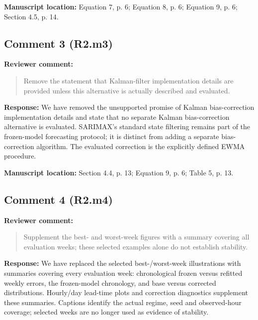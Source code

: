 \documentclass[11pt,a4paper]{article}
\begin{document}
\textbf{Manuscript location:} Equation 7, p. 6; Equation 8, p. 6; Equation 9, p. 6; Section 4.5, p. 14.
\begin{samepage}
\subsection*{Comment 3 (R2.m3)}
\textbf{Reviewer comment:}
\begin{quote}\small Remove the statement that Kalman-filter implementation details are provided unless this alternative is actually described and evaluated.\end{quote}
\end{samepage}
\textbf{Response:}
We have removed the unsupported promise of Kalman bias-correction implementation details and state that no separate Kalman bias-correction alternative is evaluated. SARIMAX's standard state filtering remains part of the frozen-model forecasting protocol; it is distinct from adding a separate bias-correction algorithm. The evaluated correction is the explicitly defined EWMA procedure.

\textbf{Manuscript location:} Section 4.4, p. 13; Equation 9, p. 6; Table 5, p. 13.
\begin{samepage}
\subsection*{Comment 4 (R2.m4)}
\textbf{Reviewer comment:}
\begin{quote}\small Supplement the best- and worst-week figures with a summary covering all evaluation weeks; these selected examples alone do not establish stability.\end{quote}
\end{samepage}
\textbf{Response:}
We have replaced the selected best-/worst-week illustrations with summaries covering every evaluation week: chronological frozen versus refitted weekly errors, the frozen-model chronology, and base versus corrected distributions. Hourly/day lead-time plots and correction diagnostics supplement these summaries. Captions identify the actual regime, seed and observed-hour coverage; selected weeks are no longer used as evidence of stability.
\end{document}
